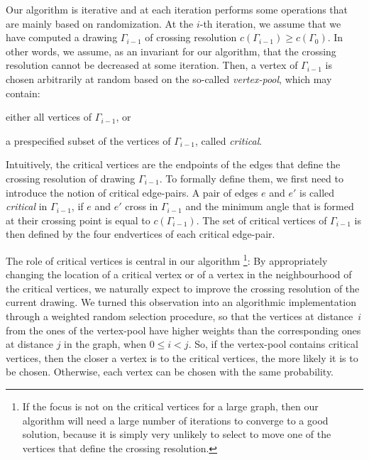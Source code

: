 \documentclass[runningheads]{llncs}
\begin{document}
Our algorithm is iterative and at each iteration performs some operations that are mainly based on randomization. At the $i$-th iteration, we assume that we have computed a drawing $\Gamma_{i-1}$ of crossing resolution $c(\Gamma_{i-1}) \geq c(\Gamma_0)$.
In other words, we assume, as an invariant for our algorithm, that the crossing resolution cannot be decreased at some iteration. Then, a vertex of $\Gamma_{i-1}$ is chosen arbitrarily at random based on the so-called \emph{vertex-pool}, which may contain:
%
\begin{inparaenum}[(i)]
\item either all vertices of $\Gamma_{i-1}$, or
\item a prespecified subset of the vertices of $\Gamma_{i-1}$, called \emph{critical}.
\end{inparaenum}

Intuitively, the critical vertices are the endpoints of the edges that define the crossing resolution of drawing $\Gamma_{i-1}$. To formally define them, we first need to introduce the notion of critical edge-pairs. A pair of edges $e$ and $e'$ is called \emph{critical} in $\Gamma_{i-1}$, if $e$ and $e'$ cross in $\Gamma_{i-1}$ and the minimum angle that is formed at their crossing point is equal to $c(\Gamma_{i-1})$. The set of critical vertices of $\Gamma_{i-1}$ is then defined by the four endvertices of each critical edge-pair.

The role of critical vertices is central in our algorithm
\footnote{If the focus is not on the critical vertices for a large graph, then our algorithm will need a large number of iterations to converge to a good solution, because it is simply very unlikely to select to move one of the vertices that define the crossing resolution.}: By appropriately changing the location of a critical vertex or of a vertex in the neighbourhood of the critical vertices, we naturally expect to improve the crossing resolution of the current drawing. We turned this observation into an algorithmic implementation through a weighted random selection procedure, so that the vertices at distance~$i$ from the ones of the vertex-pool have higher weights than the corresponding ones at distance $j$  in the graph, when $0 \leq i<j$. So, if the vertex-pool contains critical vertices, then the closer a vertex is to the critical vertices, the more likely it is to be chosen. Otherwise, each vertex can be chosen with the same probability.
\end{document}
